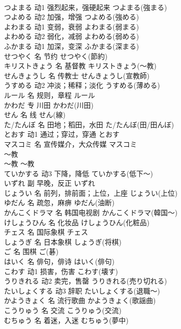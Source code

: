 \documentclass[8pt]{extreport}
\begin{document}
\begin{CJK}{UTF8}{min}
\\	つよまる	动1	强烈起来，强硬起来	つよまる(強まる)	
\\	つよめる	动2	加强，增强	つよめる(強める)	
\\	よわまる	动1	变弱，衰弱	よわまる(弱まる)	
\\	よわめる	动2	弱化，减弱	よわめる(弱める)	
\\	ふかまる	动1	加深，变深	ふかまる(深まる)	
\\	せつやく	名	节约	せつやく(節約)	
\\	キリストきょう	名	基督教	キリストきょう(～教)	
\\	せんきょうし	名	传教士	せんきょうし(宣教師)	
\\	うすめる	动2	冲淡；稀释；淡化	うすめる(薄める)	
\\	ルール	名	规则，章程	ルール	
\\	かわだ	专	川田	かわだ(川田)	
\\	せん	名	线	せん(線)	
\\	た/たんぼ	名	田地；稻田，水田	た/たんぼ(田/田んぼ)	
\\	とおす	动1	通过；穿过，穿通	とおす	
\\	マスコミ	名	宣传媒介，大众传媒	マスコミ	
\\	～教	
\\	～教	～教	
\\	ていかする	动3	下降，降低	ていかする(低下～)	
\\	いずれ	副	早晚，反正	いずれ	
\\	じょうい	名	前列，排前面；上位，上座	じょうい(上位)	
\\	ゆだん	名	疏忽，麻痹	ゆだん(油断)	
\\	かんこくドラマ	名	韩国电视剧	かんこくドラマ(韓国～)	
\\	けしょうひん	名	化妆品	けしょうひん(化粧品)	
\\	チェス	名	国际象棋	チェス	
\\	しょうぎ	名	日本象棋	しょうぎ(将棋)	
\\	ご	名	围棋	ご(碁)	
\\	はいく	名	俳句，俳诗	はいく(俳句)	
\\	こわす	动1	损害，伤害	こわす(壊す)	
\\	うりきれる	动2	卖完，售罄	うりきれる(売り切れる)	
\\	たいしょくする	动3	辞职	たいしょくする(退職～)	
\\	かようきょく	名	流行歌曲	かようきょく(歌謡曲)	
\\	こうりゅう	名	交流	こうりゅう(交流)	
\\	むちゅう	名	着迷，入迷	むちゅう(夢中)	

\end{CJK}
\end{document}
